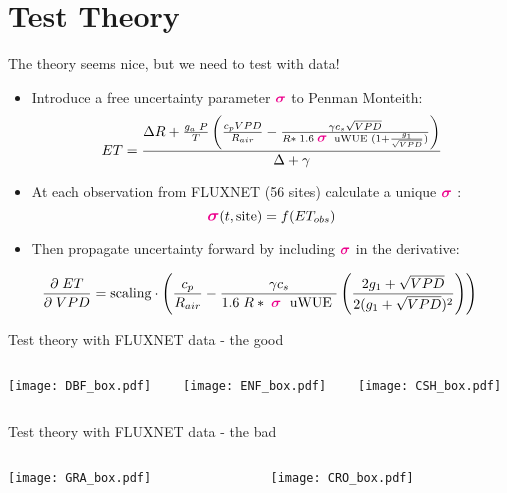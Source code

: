 \documentclass[aspectratio=169]{beamer}
\begin{document}
\section{Test Theory}
\begin{frame}{The theory seems nice, but we need to test with data!}
  \begin{itemize}
  \item Introduce a free uncertainty parameter \Large $\textcolor{magenta}{\boldsymbol{\sigma}}$ \normalsize to Penman Monteith:
    \[ET = \frac{\Delta R + \frac{g_a\; P}{T} \left( \frac{ c_p VPD}{R_{air}} -  \frac{\gamma c_s \sqrt{VPD} }{ R* \; 1.6\; \textcolor{magenta}{\boldsymbol{\mathlarger{\sigma}}} \; \text{ uWUE } (1 + \frac{g_1}{\sqrt{VPD}})} \right) }{ \Delta + \gamma}\]
  \item At each observation from FLUXNET (56 sites) calculate a unique \Large $\textcolor{magenta}{\boldsymbol{\sigma}}$ \normalsize:
    \[\textcolor{magenta}{\boldsymbol{\mathlarger{\sigma}}}(t, \text{site}) = f(ET_{obs})\]

    \item Then propagate uncertainty forward by including \Large $\textcolor{magenta}{\boldsymbol{\sigma}}$ \normalsize in the derivative:
    \end{itemize}
      \[\frac{\partial \;  ET}{\partial \; VPD} = \text{scaling} \cdot \left(\frac{ c_p}{R_{air}} -  \frac{\gamma c_s }{1.6 \; R*\; \textcolor{magenta}{\boldsymbol{\mathlarger{\sigma}}} \; \text{ uWUE }} \left( \frac{2 g_1 + \sqrt{VPD}}{2 (g_1 + \sqrt{VPD})^2}\right) \right)\]
\end{frame}
  
\begin{frame}{Test theory with FLUXNET data - the good}
  \begin{columns}
    \begin{column}{0.33\textwidth}
      \texttt{[image: DBF\_box.pdf]}
    \end{column}
    \begin{column}{0.33\textwidth}
      \texttt{[image: ENF\_box.pdf]}
    \end{column}
    \begin{column}{0.33\textwidth}
      \texttt{[image: CSH\_box.pdf]}
    \end{column}
  \end{columns}
\end{frame}


\begin{frame}{Test theory with FLUXNET data - the bad}
    \begin{columns}
    \begin{column}{0.5\textwidth}
      \texttt{[image: GRA\_box.pdf]}
    \end{column}
    \begin{column}{0.5\textwidth}
      \texttt{[image: CRO\_box.pdf]}
    \end{column}
  \end{columns}
\end{frame}
\end{document}
